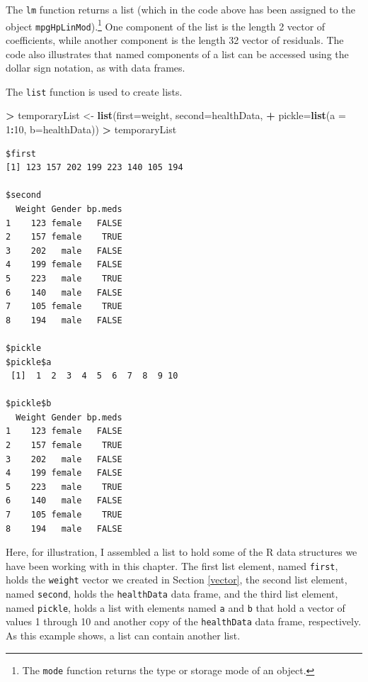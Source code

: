 \documentclass[
]{krantz}
\makeatletter
\newenvironment{Shaded}{\begin{snugshade}}{\end{snugshade}}
\newcommand{\DataTypeTok}[1]{\textcolor[rgb]{0.27,0.27,0.27}{#1}}
\newcommand{\DecValTok}[1]{\textcolor[rgb]{0.06,0.06,0.06}{#1}}
\newcommand{\KeywordTok}[1]{\textcolor[rgb]{0.27,0.27,0.27}{\textbf{#1}}}
\newcommand{\NormalTok}[1]{#1}
\newcommand{\OperatorTok}[1]{\textcolor[rgb]{0.43,0.43,0.43}{\textbf{#1}}}
\newcommand{\StringTok}[1]{\textcolor[rgb]{0.5,0.5,0.5}{#1}}
\newenvironment{kframe}{%
\medskip{}
\setlength{\fboxsep}{.8em}
 \def\at@end@of@kframe{}%
 \ifinner\ifhmode%
  \def\at@end@of@kframe{\end{minipage}}%
  \begin{minipage}{\columnwidth}%
 \fi\fi%
 \def\FrameCommand##1{\hskip\@totalleftmargin \hskip-\fboxsep
 \colorbox{shadecolor}{##1}\hskip-\fboxsep
     \hskip-\linewidth \hskip-\@totalleftmargin \hskip\columnwidth}%
 \MakeFramed {\advance\hsize-\width
   \@totalleftmargin\z@ \linewidth\hsize
   \@setminipage}}%
 {\par\unskip\endMakeFramed%
 \at@end@of@kframe}
\renewenvironment{Shaded}{\begin{kframe}}{\end{kframe}}
\makeatother
\begin{document}
The \texttt{lm} function returns a list (which in the code above has been assigned to the object \texttt{mpgHpLinMod}).\footnote{The \texttt{mode} function returns the type or storage mode of an object.} One component of the list is the length 2 vector of coefficients, while another component is the length 32 vector of residuals. The code also illustrates that named components of a list can be accessed using the dollar sign notation, as with data frames.

The \texttt{list} function is used to create lists.

\begin{Shaded}
\begin{Highlighting}[]
\OperatorTok{\textgreater{}}\StringTok{ }\NormalTok{temporaryList \textless{}{-}}\StringTok{ }\KeywordTok{list}\NormalTok{(}\DataTypeTok{first=}\NormalTok{weight, }\DataTypeTok{second=}\NormalTok{healthData,}
\OperatorTok{+}\StringTok{                       }\DataTypeTok{pickle=}\KeywordTok{list}\NormalTok{(}\DataTypeTok{a =} \DecValTok{1}\OperatorTok{:}\DecValTok{10}\NormalTok{, }\DataTypeTok{b=}\NormalTok{healthData))}
\OperatorTok{\textgreater{}}\StringTok{ }\NormalTok{temporaryList}
\end{Highlighting}
\end{Shaded}

\begin{verbatim}
$first
[1] 123 157 202 199 223 140 105 194

$second
  Weight Gender bp.meds
1    123 female   FALSE
2    157 female    TRUE
3    202   male   FALSE
4    199 female   FALSE
5    223   male    TRUE
6    140   male   FALSE
7    105 female    TRUE
8    194   male   FALSE

$pickle
$pickle$a
 [1]  1  2  3  4  5  6  7  8  9 10

$pickle$b
  Weight Gender bp.meds
1    123 female   FALSE
2    157 female    TRUE
3    202   male   FALSE
4    199 female   FALSE
5    223   male    TRUE
6    140   male   FALSE
7    105 female    TRUE
8    194   male   FALSE
\end{verbatim}

Here, for illustration, I assembled a list to hold some of the R data structures we have been working with in this chapter. The first list element, named \texttt{first}, holds the \texttt{weight} vector we created in Section \ref{vector}, the second list element, named \texttt{second}, holds the \texttt{healthData} data frame, and the third list element, named \texttt{pickle}, holds a list with elements named \texttt{a} and \texttt{b} that hold a vector of values 1 through 10 and another copy of the \texttt{healthData} data frame, respectively. As this example shows, a list can contain another list.
\end{document}
